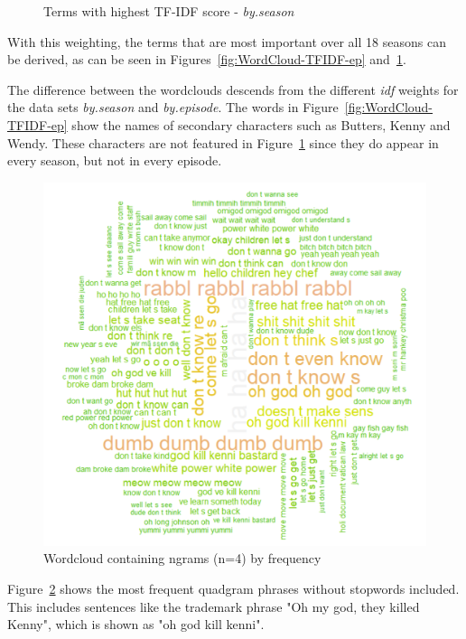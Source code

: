 \documentclass[10pt,a4paper]{article}
\begin{document}
\begin{figure}[!h]
\begin{minipage}[b]{0.5\textwidth}
    \caption{Terms with highest TF-IDF score - \textit{by.season}}
	\label{fig:WordCloud-TFIDF-s}
  \end{minipage}
\end{figure}
	
	With this weighting, the terms that are most important over all 18 seasons can be derived, as can be seen in Figures~\ref{fig:WordCloud-TFIDF-ep} and~\ref{fig:WordCloud-TFIDF-s}.
	
		The difference between the wordclouds descends from the different \textit{idf} weights for the data sets \textit{by.season} and \textit{by.episode}. The words in Figure~\ref{fig:WordCloud-TFIDF-ep} show the names of secondary characters such as Butters, Kenny and Wendy. These characters are not featured in Figure~\ref{fig:WordCloud-TFIDF-s} since they do appear in every season, but not in every episode.
		
			\begin{figure}[h]
	\centering
	\includegraphics[scale=0.5]{images/WordCloud-ngram.png}
	\caption{Wordcloud containing ngrams (n=4) by frequency}
	\label{fig:WordCloud-ngram}
	\end{figure}
		
		Figure~\ref{fig:WordCloud-ngram} shows the most frequent quadgram phrases without stopwords included. This includes sentences like the trademark phrase "Oh my god, they killed Kenny", which is shown as "oh god kill kenni".
\end{document}
